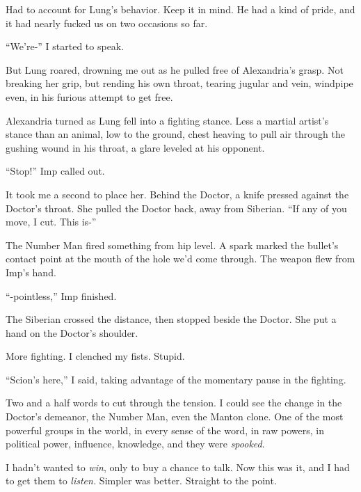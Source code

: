 Had to account for Lung's behavior.  Keep it in mind.  He had a kind of pride, and it had nearly fucked us on two occasions so far.



``We're-'' I started to speak.



But Lung roared, drowning me out as he pulled free of Alexandria's grasp.  Not breaking her grip, but rending his own throat, tearing jugular and vein, windpipe even, in his furious attempt to get free.



Alexandria turned as Lung fell into a fighting stance.  Less a martial artist's stance than an animal, low to the ground, chest heaving to pull air through the gushing wound in his throat, a glare leveled at his opponent.



``Stop!'' Imp called out.



It took me a second to place her.  Behind the Doctor, a knife pressed against the Doctor's throat.  She pulled the Doctor back, away from Siberian.  ``If any of you move, I cut.  This is-''



The Number Man fired something from hip level.  A spark marked the bullet's contact point at the mouth of the hole we'd come through.  The weapon flew from Imp's hand.



``-pointless,'' Imp finished.



The Siberian crossed the distance, then stopped beside the Doctor.  She put a hand on the Doctor's shoulder.



More fighting.  I clenched my fists.  Stupid.



``Scion's here,'' I said, taking advantage of the momentary pause in the fighting.  



Two and a half words to cut through the tension.  I could see the change in the Doctor's demeanor, the Number Man, even the Manton clone.  One of the most powerful groups in the world, in every sense of the word, in raw powers, in political power, influence, knowledge, and they were \emph{spooked}.



I hadn't wanted to \emph{win}, only to buy a chance to talk.  Now this was it, and I had to get them to \emph{listen.}  Simpler was better.  Straight to the point.



